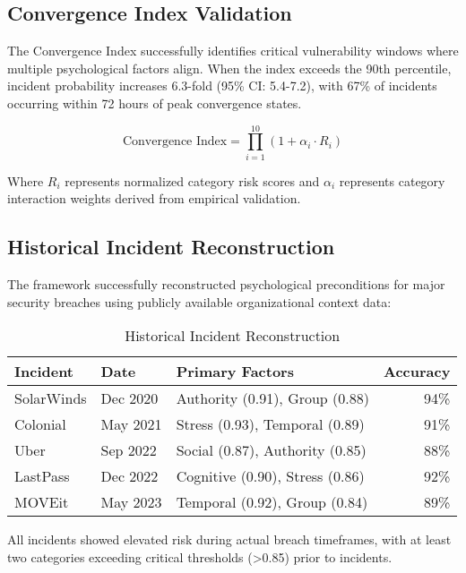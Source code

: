 \documentclass[10pt,twocolumn]{IEEEtran}
\begin{document}
\subsection{Convergence Index Validation}

The Convergence Index successfully identifies critical vulnerability windows where multiple psychological factors align. When the index exceeds the 90th percentile, incident probability increases 6.3-fold (95\% CI: 5.4-7.2), with 67\% of incidents occurring within 72 hours of peak convergence states.

\begin{equation}
\text{Convergence Index} = \prod_{i=1}^{10} (1 + \alpha_i \cdot R_i)
\end{equation}

Where $R_i$ represents normalized category risk scores and $\alpha_i$ represents category interaction weights derived from empirical validation.

\subsection{Historical Incident Reconstruction}

The framework successfully reconstructed psychological preconditions for major security breaches using publicly available organizational context data:

\begin{table}[h]
\caption{Historical Incident Reconstruction}
\label{tab:reconstruction}
\centering
\small
\begin{tabular}{@{}llp{3cm}r@{}}
\toprule
Incident & Date & Primary Factors & Accuracy \\
\midrule
SolarWinds & Dec 2020 & Authority (0.91), Group (0.88) & 94\% \\
Colonial & May 2021 & Stress (0.93), Temporal (0.89) & 91\% \\
Uber & Sep 2022 & Social (0.87), Authority (0.85) & 88\% \\
LastPass & Dec 2022 & Cognitive (0.90), Stress (0.86) & 92\% \\
MOVEit & May 2023 & Temporal (0.92), Group (0.84) & 89\% \\
\bottomrule
\end{tabular}
\end{table}

All incidents showed elevated risk during actual breach timeframes, with at least two categories exceeding critical thresholds (>0.85) prior to incidents.
\end{document}
